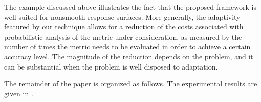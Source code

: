 The example discussed above illustrates the fact that the proposed framework is
well suited for nonsmooth response surfaces. More generally, the adaptivity
featured by our technique allows for a reduction of the costs associated with
probabilistic analysis of the metric under consideration, as measured by the
number of times the metric needs to be evaluated in order to achieve a certain
accuracy level. The magnitude of the reduction depends on the problem, and it
can be substantial when the problem is well disposed to adaptation.

The remainder of the paper is organized as follows.
 The experimental results are
given in . 
